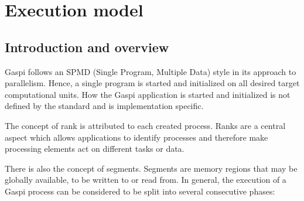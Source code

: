 \documentclass{article}
\newlength{\st}\setlength{\st}{0pt}
\newcommand{\GASPI}{{\sc Gaspi}}
\begin{document}
\section{Execution model}

\subsection{Introduction and overview}
\label{SubSec:ExecPhases}

\GASPI{} follows an SPMD (Single Program, Multiple Data) style in its
approach to parallelism. Hence, a single program is started and initialized
on all desired target computational units. How the \GASPI{} application is started and initialized
is not defined by the standard and is implementation specific.

The concept of rank is attributed to each created process. Ranks are
a central aspect which allows applications to identify processes and therefore make
processing elements act on different tasks or data.

There is also the concept of segments. Segments are memory regions
that may be globally available, to be written to or read from. In general,
the execution of a \GASPI{} process can be considered to be split
into several consecutive phases:
\end{document}
